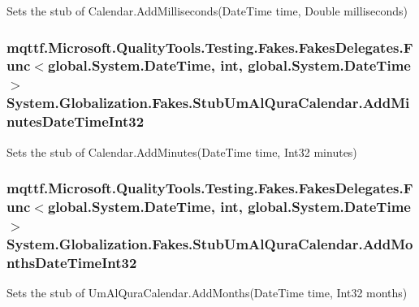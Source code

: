 Sets the stub of Calendar.\-Add\-Milliseconds(\-Date\-Time time, Double milliseconds)

\hypertarget{class_system_1_1_globalization_1_1_fakes_1_1_stub_um_al_qura_calendar_aed584e389ba72da2be250e8ba3858139}{
\subsubsection[{Add\-Minutes\-Date\-Time\-Int32}]{\setlength{\rightskip}{0pt plus 5cm}mqttf.\-Microsoft.\-Quality\-Tools.\-Testing.\-Fakes.\-Fakes\-Delegates.\-Func$<$global.\-System.\-Date\-Time, int, global.\-System.\-Date\-Time$>$ System.\-Globalization.\-Fakes.\-Stub\-Um\-Al\-Qura\-Calendar.\-Add\-Minutes\-Date\-Time\-Int32}}\label{class_system_1_1_globalization_1_1_fakes_1_1_stub_um_al_qura_calendar_aed584e389ba72da2be250e8ba3858139}


Sets the stub of Calendar.\-Add\-Minutes(\-Date\-Time time, Int32 minutes)

\hypertarget{class_system_1_1_globalization_1_1_fakes_1_1_stub_um_al_qura_calendar_a77b49ea9d382976958a514dbcce9fc7a}{
\subsubsection[{Add\-Months\-Date\-Time\-Int32}]{\setlength{\rightskip}{0pt plus 5cm}mqttf.\-Microsoft.\-Quality\-Tools.\-Testing.\-Fakes.\-Fakes\-Delegates.\-Func$<$global.\-System.\-Date\-Time, int, global.\-System.\-Date\-Time$>$ System.\-Globalization.\-Fakes.\-Stub\-Um\-Al\-Qura\-Calendar.\-Add\-Months\-Date\-Time\-Int32}}\label{class_system_1_1_globalization_1_1_fakes_1_1_stub_um_al_qura_calendar_a77b49ea9d382976958a514dbcce9fc7a}


Sets the stub of Um\-Al\-Qura\-Calendar.\-Add\-Months(\-Date\-Time time, Int32 months)

